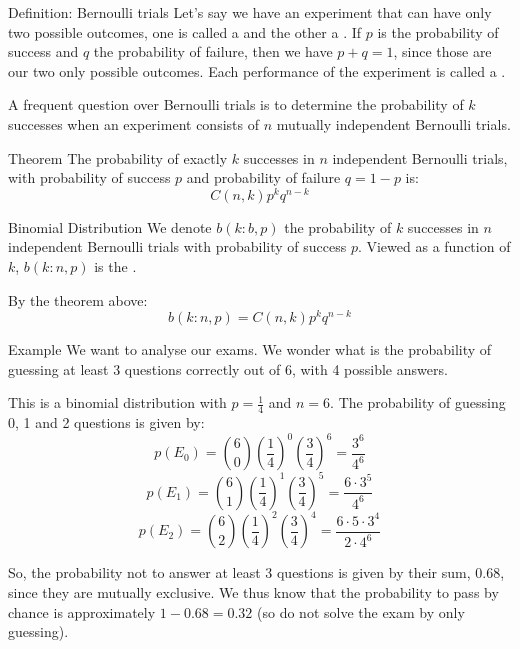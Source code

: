 \documentclass[a4paper]{article}
\begin{document}
\begin{parag}{Definition: Bernoulli trials}
    Let's say we have an experiment that can have only two possible outcomes, one is called a  and the other a . If $p$ is the probability of success and $q$ the probability of failure, then we have $p + q = 1$, since those are our two only possible outcomes. Each performance of the experiment is called a .

    A frequent question over Bernoulli trials is to determine the probability of $k$ successes when an experiment consists of $n$ mutually independent Bernoulli trials.
\end{parag}

\begin{parag}{Theorem}
    The probability of exactly $k$ successes in $n$ independent Bernoulli trials, with probability of success $p$ and probability of failure $q = 1 - p$ is: 
    \[C\left(n, k\right) p^k q^{n-k}\]
\end{parag}


\begin{parag}{Binomial Distribution}
    We denote $b\left(k:b, p\right)$ the probability of $k$ successes in $n$ independent Bernoulli trials with probability of success $p$. Viewed as a function of $k$, $b\left(k:n, p\right)$ is the .

    By the theorem above: 
    \[b\left(k: n, p\right) = C\left(n, k\right)p^k q^{n-k}\]
\end{parag}

\begin{parag}{Example}
    We want to analyse our exams. We wonder what is the probability of guessing at least 3 questions correctly out of 6, with 4 possible answers.

    This is a binomial distribution with $p = \frac{1}{4}$ and $n = 6$. The probability of guessing 0, 1 and 2 questions is given by: 
    \[p\left(E_0\right) = \binom{6}{0} \left(\frac{1}{4}\right)^0 \left(\frac{3}{4}\right)^6 = \frac{3^6}{4^6}\]
    \[p\left(E_1\right) = \binom{6}{1} \left(\frac{1}{4}\right)^1 \left(\frac{3}{4}\right)^5 = \frac{6 \cdot 3^5}{4^6}\]
    \[p\left(E_2\right) = \binom{6}{2} \left(\frac{1}{4}\right)^2 \left(\frac{3}{4}\right)^4 = \frac{6\cdot 5 \cdot 3^4}{2\cdot 4^6}\]
    
    So, the probability not to answer at least 3 questions is given by their sum, $0.68$, since they are mutually exclusive. We thus know that the probability to pass by chance is approximately $1 - 0.68 = 0.32$ (so do not solve the exam by only guessing).
\end{parag}
\end{document}
